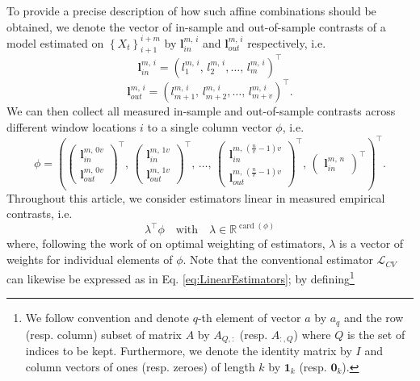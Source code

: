 \documentclass[11pt,dvipsnames]{article}
\DeclareMathOperator{\cardt}{card}
\begin{document}
To provide a precise description of how such affine combinations should be obtained, we denote the vector of in-sample and out-of-sample contrasts of a model estimated on $ \left\lbrace X_{t} \right\rbrace_{i+1}^{i+m} $ by $ \boldsymbol{l}_{in}^{m,\,i} $ and $ \boldsymbol{l}_{out}^{m,\,i} $ respectively, i.e.
\begin{equation}
\boldsymbol{l}_{in}^{m,\,i}=\left( l_{1}^{m,\,i},\,l_{2}^{m,\,i},\ldots,\, l_{m}^{m,\,i}\right) ^{\top}
\end{equation}
\begin{equation}
\boldsymbol{l}_{out}^{m,\,i}=\left( l_{m+1}^{m,\,i},\,l_{m+2}^{m,\,i},\ldots,\, l_{m+v}^{m,\,i}\right) ^{\top}.
\end{equation}
We can then collect all measured in-sample and out-of-sample contrasts across different window locations $ i $ to a single column vector $ \phi $, i.e.
\begin{equation}
\phi=\left( 
\begin{pmatrix}
\boldsymbol{l}_{in}^{m,\,0v}\\
\boldsymbol{l}_{out}^{m,\,0v}
\end{pmatrix} ^{\top},\,
\begin{pmatrix}
\boldsymbol{l}_{in}^{m,\,1v}\\
\boldsymbol{l}_{out}^{m,\,1v}
\end{pmatrix} ^{\top},\,
\ldots ,\,
\begin{pmatrix}
\boldsymbol{l}_{in}^{m,\,(\frac{n}{v}-1)v}\\
\boldsymbol{l}_{out}^{m,\,(\frac{n}{v}-1)v}
\end{pmatrix} ^{\top},\,
\begin{pmatrix}
\boldsymbol{l}_{in}^{m,\,n}
\end{pmatrix} ^{\top}
\right) ^{\top}.
\end{equation}
Throughout this article, we consider estimators linear in measured empirical contrasts, i.e.
\begin{equation}\label{eq:LinearEstimators} 
 \lambda^{\top} \phi  \quad  \textrm{with} \quad \lambda \in \mathbb{R}^{\cardt(\phi)}
\end{equation}
where, following the work of \citet{lavancierGeneralProcedureCombine2016} on optimal weighting of estimators,  $ \lambda$ is a vector of weights for individual elements of $ \phi $. Note that the conventional estimator $ \widehat{\mathcal{L}}_{CV} $ can likewise be expressed as in Eq. \ref{eq:LinearEstimators}; by defining\footnote{We follow convention and denote $ q $-th element of vector $ a $ by $ a_{q} $ and the row (resp. column) subset of matrix $ A $  by $ A_{Q,:} $ (resp. $ A_{:,Q} $) where $ Q $ is the set of indices to be kept. Furthermore, we denote the identity matrix by  $ I $ and column vectors of ones (resp. zeroes) of length $ k $ by $ \mathbf{1}_{k} $ (resp. $ \mathbf{0}_{k} $).}
\end{document}
